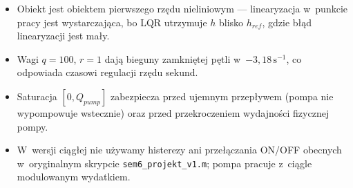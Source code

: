 \documentclass[11pt,a4paper]{article}
\begin{document}
\begin{itemize}\setlength{\itemsep}{2pt}
\item Obiekt jest obiektem pierwszego rzędu nieliniowym ---
      linearyzacja w~punkcie pracy jest wystarczająca, bo LQR utrzymuje
      $h$ blisko $h_{ref}$, gdzie błąd linearyzacji jest mały.
\item Wagi $q=100$, $r=1$ dają bieguny zamkniętej pętli w~$-3{,}18\,\mathrm{s}^{-1}$,
      co odpowiada czasowi regulacji rzędu sekund.
\item Saturacja $[0,Q_{pump}]$ zabezpiecza przed ujemnym przepływem
      (pompa nie wypompowuje wstecznie) oraz przed przekroczeniem
      wydajności fizycznej pompy.
\item W~wersji ciągłej nie używamy histerezy ani przełączania ON/OFF
      obecnych w~oryginalnym skrypcie \texttt{sem6\_projekt\_v1.m};
      pompa pracuje z~ciągle modulowanym wydatkiem.
\end{itemize}
\end{document}
